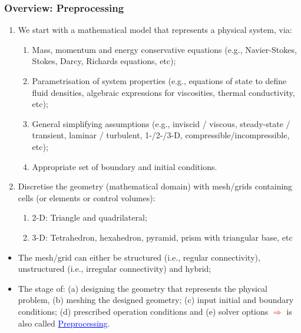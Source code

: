 \documentclass[10pt,compress,handout,ignorenonframetext]{beamer}
\begin{document}
\begin{frame}
 \frametitle{Overview: Preprocessing} 
\begin{enumerate}
  \item <1-> We start with a mathematical model that represents a physical system, via:
    \begin{enumerate}
      \item <2-> Mass, momentum and energy conservative equations (e.g., Navier-Stokes, Stokes, Darcy, Richards equations, etc);
      \item <3-> Parametrisation of system properties (e.g., equations of state to define fluid densities, algebraic expressions for viscosities, thermal conductivity, etc);
      \item <4-> General simplifying assumptions (e.g., inviscid / viscous, steady-state / transient, laminar / turbulent, 1-/2-/3-D, compressible/incompressible, etc); 
      \item <5-> Appropriate set of boundary and initial conditions.
    \end{enumerate}
  \item <6-> Discretise the geometry (mathematical domain) with mesh/grids containing cells (or elements or control volumes): 
    \begin{enumerate}
      \item <7-> 2-D: Triangle and quadrilateral;
      \item <8-> 3-D: Tetrahedron, hexahedron, pyramid, prism with triangular base, etc 
    \end{enumerate}
\end{enumerate} 
\begin{itemize}
   \item <9-> The mesh/grid can either be structured (i.e., regular connectivity), unstructured (i.e., irregular connectivity) and hybrid;
   \item <10-> The stage of: (a) designing the geometry that represents the physical problem, (b) meshing the designed geometry; (c) input initial and boundary conditions; (d) prescribed operation conditions and (e) solver options \textcolor{red}{$\Longrightarrow$} is also called \textcolor{blue}{\underline{Preprocessing}}.
\end{itemize}  

\end{frame} 
\end{document}
